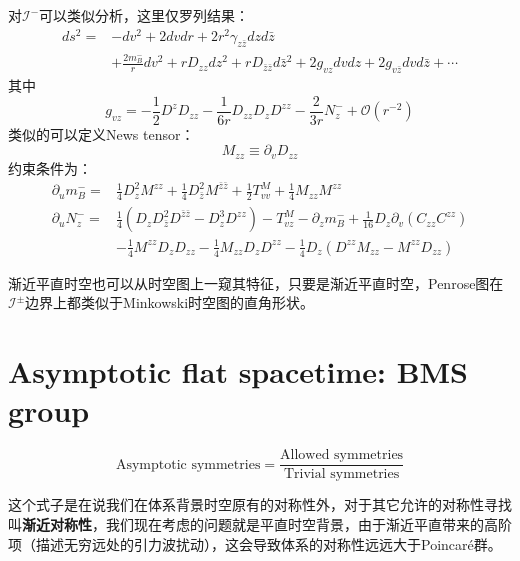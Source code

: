 对$\mathcal{I}^{-}$可以类似分析，这里仅罗列结果：
\begin{equation}
	\begin{aligned}
		ds^2=&-dv^2+2dvdr+2r^2\gamma_{z\bar z}dzd{\bar z}\\
		&+\frac{2m^-_B}{r}dv^2+rD_{zz}dz^2+rD_{\bar z\bar z}d{\bar z}^2+2g_{vz}dvdz+2g_{v\bar z}dvd\bar z+\cdots
	\end{aligned}
\end{equation}
其中
\begin{equation}
	g_{vz}=-\frac{1}{2}D^zD_{zz}-\frac{1}{6r}D_{zz}D_zD^{zz}-\frac{2}{3r}N^-_z+\mathcal{O}(r^{-2})
\end{equation}
类似的可以定义News tensor：
\begin{equation}
	M_{zz}\equiv \partial_v D_{zz}
\end{equation}
约束条件为：
\begin{equation}
	\begin{aligned}
		\partial_u m^-_B=&\frac{1}{4}D_z^2M^{zz}+\frac{1}{4}D_{\bar z}^2M^{\bar z\bar z}+\frac{1}{2}T^M_{vv}+\frac{1}{4}M_{zz}M^{zz}\\
		\partial_u N^-_z=&\frac{1}{4}\left(D_zD_{\bar z}^2D^{\bar z\bar z}-D^3_zD^{zz}\right)-T^{M}_{vz}-\partial_z m^-_B+\frac{1}{16}D_z\partial_v(C_{zz}C^{zz})\\
		&-\frac{1}{4}M^{zz}D_zD_{zz}-\frac{1}{4}M_{zz}D_zD^{zz}-\frac{1}{4}D_z\left(D^{zz}M_{zz}-M^{zz}D_{zz}\right)
	\end{aligned}
\end{equation}

渐近平直时空也可以从时空图上一窥其特征\cite{zhaoliu}，只要是渐近平直时空，Penrose图在$\mathcal{I}^\pm$边界上都类似于Minkowski时空图的直角形状。

\section{Asymptotic flat spacetime: BMS group}
\begin{equation}
	\text{Asymptotic symmetries}=\frac{\text{Allowed symmetries}}{\text{Trivial symmetries}}
\end{equation}

这个式子是在说我们在体系背景时空原有的对称性外，对于其它允许的对称性寻找叫\textbf{渐近对称性}，我们现在考虑的问题就是平直时空背景，由于渐近平直带来的高阶项（描述无穷远处的引力波扰动），这会导致体系的对称性远远大于Poincar\'e群。

